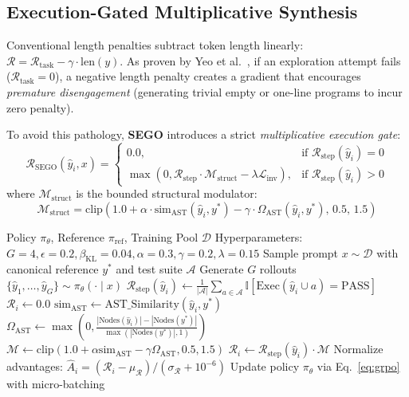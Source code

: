 \documentclass[10pt,twocolumn,letterpaper]{article}
\newcommand{\I}{\mathbb{I}}
\newcommand{\simAST}{\text{sim}_{\text{AST}}}
\newcommand{\OmegaAST}{\Omega_{\text{AST}}}
\newcommand{\Rstep}{\mathcal{R}_{\text{step}}}
\newcommand{\Rsego}{\mathcal{R}_{\text{SEGO}}}
\newcommand{\Linv}{\mathcal{L}_{\text{inv}}}
\begin{document}
\subsection{Execution-Gated Multiplicative Synthesis}
Conventional length penalties subtract token length linearly: $\mathcal{R} = \mathcal{R}_{\text{task}} - \gamma \cdot \text{len}(y)$. As proven by Yeo et al.~\cite{yeo2025demystifying}, if an exploration attempt fails ($\mathcal{R}_{\text{task}}=0$), a negative length penalty creates a gradient that encourages \textit{premature disengagement} (generating trivial empty or one-line programs to incur zero penalty).

To avoid this pathology, \textbf{SEGO} introduces a strict \textit{multiplicative execution gate}:
\begin{equation}
\Rsego(\hat{y}_i, x) = \begin{cases}
0.0, & \text{if } \Rstep(\hat{y}_i) = 0 \\
\max\left(0, \Rstep \cdot \mathcal{M}_{\text{struct}} - \lambda \Linv\right), & \text{if } \Rstep(\hat{y}_i) > 0
\end{cases}
\label{eq:sego}
\end{equation}
where $\mathcal{M}_{\text{struct}}$ is the bounded structural modulator:
\begin{equation}
\mathcal{M}_{\text{struct}} = \text{clip}\left(1.0 + \alpha \cdot \simAST(\hat{y}_i, y^*) - \gamma \cdot \OmegaAST(\hat{y}_i, y^*), \, 0.5, \, 1.5\right)
\label{eq:multiplier}
\end{equation}

\begin{algorithm}[t]
\caption{SEGO-GRPO Policy Optimization}
\label{alg:sego}
\begin{algorithmic}[1]
\Require Policy $\pi_\theta$, Reference $\pi_{\text{ref}}$, Training Pool $\mathcal{D}$
\Require Hyperparameters: $G=4, \epsilon=0.2, \beta_{\text{KL}}=0.04, \alpha=0.3, \gamma=0.2, \lambda=0.15$
    \State Sample prompt $x \sim \mathcal{D}$ with canonical reference $y^*$ and test suite $\mathcal{A}$
    \State Generate $G$ rollouts $\{\hat{y}_1, \dots, \hat{y}_G\} \sim \pi_\theta(\cdot \mid x)$
        \State $\Rstep(\hat{y}_i) \gets \frac{1}{|\mathcal{A}|} \sum_{a \in \mathcal{A}} \I[\text{Exec}(\hat{y}_i \cup a) = \text{PASS}]$
        \If{$\Rstep(\hat{y}_i) == 0$}
            \State $\mathcal{R}_i \gets 0.0$ 
        \Else
            \State $\simAST \gets \text{AST\_Similarity}(\hat{y}_i, y^*)$
            \State $\OmegaAST \gets \max\left(0, \frac{|\text{Nodes}(\hat{y}_i)| - |\text{Nodes}(y^*)|}{\max(|\text{Nodes}(y^*)|, 1)}\right)$
            \State $\mathcal{M} \gets \text{clip}(1.0 + \alpha \simAST - \gamma \OmegaAST, 0.5, 1.5)$
            \State $\mathcal{R}_i \gets \Rstep(\hat{y}_i) \cdot \mathcal{M}$
        \EndIf
    \EndFor
    \State Normalize advantages: $\hat{A}_i = (\mathcal{R}_i - \mu_{\mathcal{R}}) / (\sigma_{\mathcal{R}} + 10^{-6})$
    \State Update policy $\pi_\theta$ via Eq.~\eqref{eq:grpo} with micro-batching
\EndFor
\end{algorithmic}
\end{algorithm}
\end{document}
